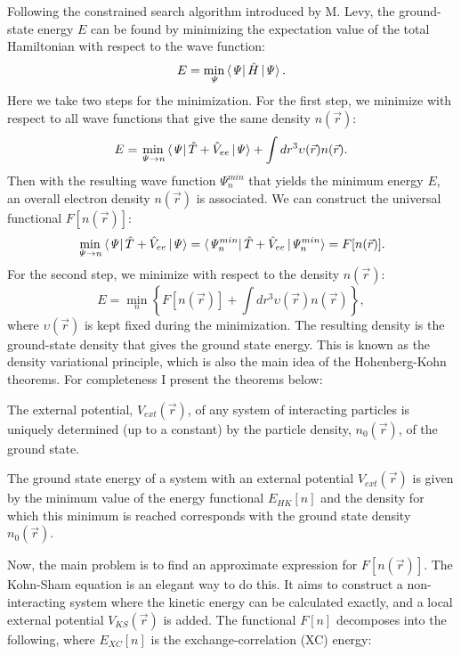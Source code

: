 Following the constrained search algorithm introduced by M. Levy\cite{Levy1979}, the ground-state energy $E$ can be found by minimizing the expectation value of the total Hamiltonian with respect to the wave function:
\begin{equation}
E=\min_\mathit{\Psi}\bra{\mathit{\Psi}}\hat{H}\ket{\mathit{\Psi}}.
\end{equation}
Here we take two steps for the minimization. For the first step, we minimize with respect to all wave functions that give the same density $n(\vec{r})$:
\begin{equation}
E=\min_{\mathit{\Psi}\rightarrow n}\bra{\mathit{\Psi}}\hat{T}+\hat{V}_{ee}\ket{\mathit{\Psi}}+\int dr^3\upsilon(\vec{r})n(\vec{r}).
\end{equation}
Then with the resulting wave function $\mathit{\Psi}^{min}_n$ that yields the minimum energy $E$, an overall electron density $n(\vec{r})$ is associated. We can construct the universal functional $F[n(\vec{r})]$:
\begin{equation}
\min_{\mathit{\Psi}\rightarrow n}\bra{\mathit{\Psi}}\hat{T}+\hat{V}_{ee}\ket{\mathit{\Psi}}=\bra{\mathit{\Psi}^{min}_n}\hat{T}+\hat{V}_{ee}\ket{\mathit{\Psi}^{min}_n}=F[n(\vec{r})].
\end{equation}
For the second step, we minimize with respect to the density $n(\vec{r})$:
\begin{equation}
E=\min_n \left\lbrace F[n(\vec{r})] + \int dr^3\upsilon(\vec{r})n(\vec{r}) \right\rbrace,
\end{equation}
where $\upsilon(\vec{r})$ is kept fixed during the minimization. The resulting density is the ground-state density that gives the ground state energy. This is known as the density variational principle, which is also the main idea of the Hohenberg-Kohn theorems. For completeness I present the theorems below:
\begin{theorem}
The external potential, $V_{ext}(\vec{r})$, of any system of interacting particles is uniquely determined (up to a constant) by the particle density, $n_0(\vec{r})$, of the ground state.
\end{theorem}
\begin{theorem}
The ground state energy of a system with an external potential $V_{ext}(\vec{r})$ is given by the minimum value of the energy functional $E_{HK} [n]$ and the density for which this minimum is reached corresponds with the ground state density $n_0(\vec{r})$.
\end{theorem}
Now, the main problem is to find an approximate expression for $F[n(\vec{r})]$. The Kohn-Sham equation is an elegant way to do this. It aims to construct a non-interacting system where the kinetic energy can be calculated exactly, and a local external potential $V_{KS}(\vec{r})$ is added. The functional $F[n]$ decomposes into the following, where $E_{XC}[n]$ is the exchange-correlation (XC) energy:
